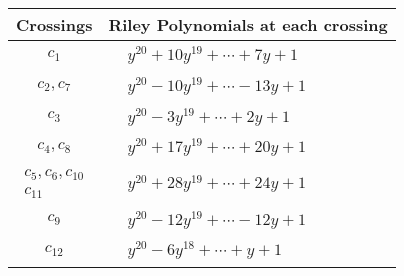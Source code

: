 \documentclass[1p]{elsarticle_modified}
\theoremstyle{definition}
\begin{document}
\begin{tabular}{m{50pt}|m{274pt}}
Crossings & \hspace{64pt}Riley Polynomials at each crossing \\
\hline $$\begin{aligned}c_{1}\end{aligned}$$&$\begin{aligned}
&y^{20}+10 y^{19}+\cdots+7 y+1
\end{aligned}$\\
\hline $$\begin{aligned}c_{2},c_{7}\end{aligned}$$&$\begin{aligned}
&y^{20}-10 y^{19}+\cdots-13 y+1
\end{aligned}$\\
\hline $$\begin{aligned}c_{3}\end{aligned}$$&$\begin{aligned}
&y^{20}-3 y^{19}+\cdots+2 y+1
\end{aligned}$\\
\hline $$\begin{aligned}c_{4},c_{8}\end{aligned}$$&$\begin{aligned}
&y^{20}+17 y^{19}+\cdots+20 y+1
\end{aligned}$\\
\hline $$\begin{aligned}c_{5},c_{6},c_{10}\\c_{11}\end{aligned}$$&$\begin{aligned}
&y^{20}+28 y^{19}+\cdots+24 y+1
\end{aligned}$\\
\hline $$\begin{aligned}c_{9}\end{aligned}$$&$\begin{aligned}
&y^{20}-12 y^{19}+\cdots-12 y+1
\end{aligned}$\\
\hline $$\begin{aligned}c_{12}\end{aligned}$$&$\begin{aligned}
&y^{20}-6 y^{18}+\cdots+y+1
\end{aligned}$\\
\hline
\end{tabular}\\~\\
\end{document}
